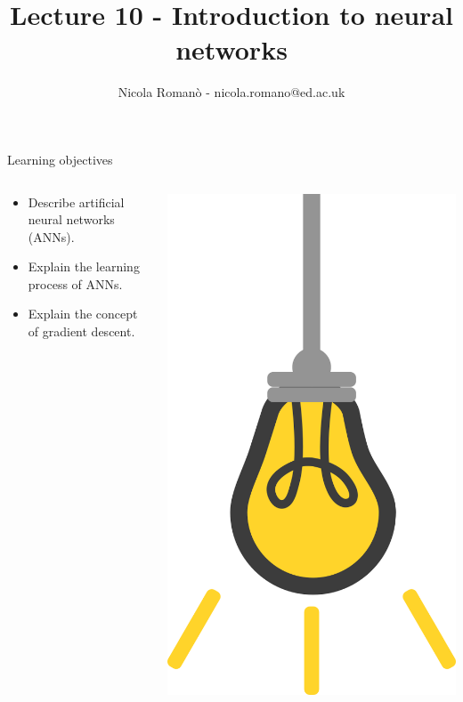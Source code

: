 \documentclass[9pt, aspectratio=169]{beamer}
\author{Nicola Roman\`o - nicola.romano@ed.ac.uk}
\title{Lecture 10 - Introduction to neural networks}
\date{}
\begin{document}

\begin{frame}
    \titlepage
\end{frame}

\begin{frame}
    {Learning objectives}
    \begin{columns}
        \begin{column}{0.8\textwidth}
            \begin{itemize}
                \item Describe artificial neural networks (ANNs).
                \item Explain the learning process of ANNs.
                \item Explain the concept of gradient descent.
            \end{itemize}
        \end{column}
        \begin{column}{0.2\textwidth}
            \includegraphics[angle=-30, origin=tr, width=1.5\textwidth]{lightbulb.png}

\end{column}
\end{columns}
\end{frame}
\end{document}
